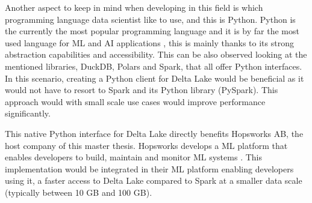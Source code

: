 Another aspect to keep in mind when developing in this field is which programming language data scientist like to use, and this is Python. Python is the currently the most popular programming language \cite{TIOBEIndex} and it is by far the most used language for \gls{ML} and \gls{AI} applications \cite{python-machine-learning}, this is mainly thanks to its strong abstraction capabilities and accessibility. This can be also observed looking at the mentioned libraries, DuckDB, Polars and Spark, that all offer Python interfaces.
In this scenario, creating a Python client for Delta Lake would be beneficial as it would not have to resort to Spark and its Python library (PySpark). This approach would with small scale use cases would improve performance significantly.

This native Python interface for Delta Lake directly benefits Hopsworks AB, the host company of this master thesis. Hopsworks develops a \gls{ML} platform that enables developers to build, maintain and monitor \gls{ML} systems \cite{HopsworksBatchRealtime}. This implementation would be integrated in their \gls{ML} platform enabling developers using it, a faster access to Delta Lake compared to Spark at a smaller data scale (typically between 10 GB and 100 GB).